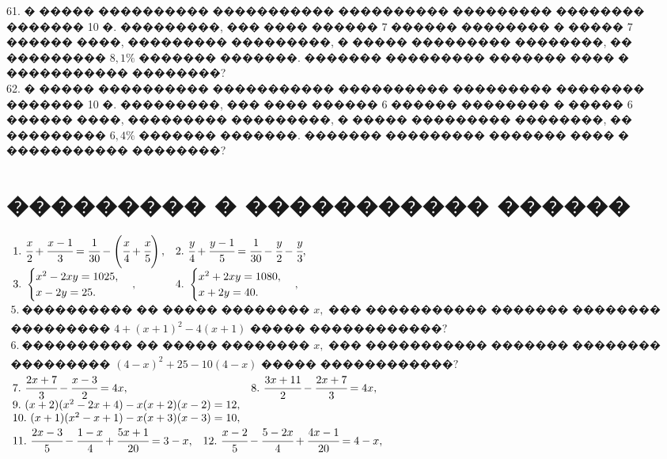 \documentclass[12pt]{article}
\begin{document}
61.  � ����� ���������� ����������� ���������� ��������� �������� ������� 10 �. ���������, ���
���� ������ 7 ������ �������� � ����� 7 ������ ����, ��������� ���������, � ����� ���������
��������, �� ��������� $8,1\%$ ������� �������. ������� ��������� ������� ���� � ����������� ��������?\\
62. � ����� ���������� ����������� ���������� ��������� �������� ������� 10 �. ���������, ���
���� ������ 6 ������ �������� � ����� 6 ������ ����, ��������� ���������, � ����� ���������
��������, �� ��������� $6,4\%$ ������� �������. ������� ��������� ������� ���� � �����������
��������?
\newpage
\section{��������� � ����������� ������}
$\begin{array}{ll}
1.\ \cfrac{x}{2}+\cfrac{x-1}{3}=\cfrac{1}{30}-\left(\cfrac{x}{4}+\cfrac{x}{5}\right),&
2.\ \cfrac{y}{4}+\cfrac{y-1}{5}=\cfrac{1}{30}-\cfrac{y}{2}-\cfrac{y}{3},\\
3.\ \begin{cases} x^2-2xy=1025,\\x-2y=25.\end{cases},&
4.\ \begin{cases} x^2+2xy=1080,\\x+2y=40.\end{cases},\end{array}$\\
$\begin{array}{l}
5.\ \text{���������� �� ����� �������� }x,\text{ ��� ����������� ������� ��������}\\
\text{��������� }4+(x+1)^2-4(x+1)\text{ ����� ������������?}\\
6.\ \text{���������� �� ����� �������� }x,\text{ ��� ����������� ������� ��������}\\
\text{��������� }(4-x)^2+25-10(4-x)\text{ ����� ������������?}
\end{array}$\\
$\begin{array}{ll}
7.\ \cfrac{2x+7}{3}-\cfrac{x-3}{2}=4x,&
8.\ \cfrac{3x+11}{2}-\cfrac{2x+7}{3}=4x,\\
9.\ (x+2)(x^2-2x+4)-x(x+2)(x-2)=12,\\
10.\ (x+1)(x^2-x+1)-x(x+3)(x-3)=10,\end{array}$\\
$\begin{array}{ll}11.\ \cfrac{2x-3}{5}-\cfrac{1-x}{4}+\cfrac{5x+1}{20}=3-x,&
12.\ \cfrac{x-2}{5}-\cfrac{5-2x}{4}+\cfrac{4x-1}{20}=4-x,
\end{array}$\\
\end{document}
